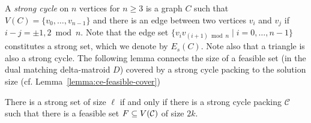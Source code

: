 \tcamfpt*

A \emph{strong cycle} on $n$ vertices for $n \ge 3$ is a graph $C$ such that $V(C) = \{ v_0, \dots, v_{n - 1} \}$ and there is an edge between two vertices $v_i$ and $v_j$ if 
$i - j = \pm 1, 2 \bmod n$.
Note that the edge set $\{ v_{i} v_{(i + 1) \bmod n} \mid i = 0, \dots, n - 1 \}$ constitutes a strong set, which we denote by $E_s(C)$.
Note also that a triangle is also a strong cycle.
The following lemma connects the size of a feasible set (in the dual matching delta-matroid $D$) covered by a strong cycle packing to the solution size (cf. Lemma~\ref{lemma:ce-feasible-cover})

\begin{lemma} \label{lemma:tc-feasible-cover}
  There is a strong set of size $\ell$ if and only if there is a strong cycle packing $\mathcal{C}$ such that there is a feasible set $F \subseteq V(\mathcal C)$ of size $2k$.
\end{lemma}
